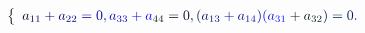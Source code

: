 \documentclass[12pt]{article}
\begin{document}
\makeatletter
\renewcommand*{\@textcolor}[3]{%
  \protect\leavevmode
  \begingroup
    \color#1{#2}#3%
  \endgroup
}
\makeatother
\begin{displaymath}
\mathcolor[RGB]{0,0,15}{\left\{} \begin{array} {c} \mathcolor[RGB]{0,0,30}{\textstyle} { \mathcolor[RGB]{0,0,45}{a} _ { \mathcolor[RGB]{0,0,60}{1} \mathcolor[RGB]{0,0,75}{1} } \mathcolor[RGB]{0,0,90}{+} \mathcolor[RGB]{0,0,105}{a} _ { \mathcolor[RGB]{0,0,120}{2} \mathcolor[RGB]{0,0,135}{2} } \mathcolor[RGB]{0,0,150}{=} \mathcolor[RGB]{0,0,165}{0} \mathcolor[RGB]{0,0,180}{,} \mathcolor[RGB]{0,0,195}{a} _ { \mathcolor[RGB]{0,0,210}{3} \mathcolor[RGB]{0,0,225}{3} } \mathcolor[RGB]{0,0,240}{+} \mathcolor[RGB]{0,0,255}{a} _ { \mathcolor[RGB]{0,15,0}{4} \mathcolor[RGB]{0,15,15}{4} } \mathcolor[RGB]{0,15,30}{=} \mathcolor[RGB]{0,15,45}{0} \mathcolor[RGB]{0,15,60}{,} \mathcolor[RGB]{0,15,75}{(} \mathcolor[RGB]{0,15,90}{a} _ { \mathcolor[RGB]{0,15,105}{1} \mathcolor[RGB]{0,15,120}{3} } \mathcolor[RGB]{0,15,135}{+} \mathcolor[RGB]{0,15,150}{a} _ { \mathcolor[RGB]{0,15,165}{1} \mathcolor[RGB]{0,15,180}{4} } \mathcolor[RGB]{0,15,195}{)} \mathcolor[RGB]{0,15,210}{(} \mathcolor[RGB]{0,15,225}{a} _ { \mathcolor[RGB]{0,15,240}{3} \mathcolor[RGB]{0,15,255}{1} } \mathcolor[RGB]{0,30,0}{+} \mathcolor[RGB]{0,30,15}{a} _ { \mathcolor[RGB]{0,30,30}{3} \mathcolor[RGB]{0,30,45}{2} } \mathcolor[RGB]{0,30,60}{)} \mathcolor[RGB]{0,30,75}{=} \mathcolor[RGB]{0,30,90}{0} \mathcolor[RGB]{0,30,105}{.} } \end{array} \mathcolor[RGB]{0,30,120}{\right.}
\end{displaymath}
\end{document}
